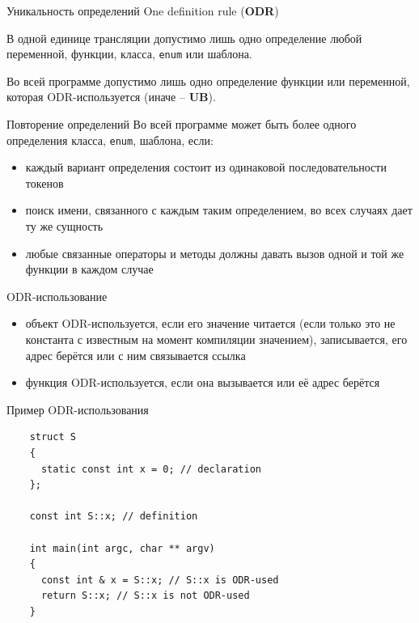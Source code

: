 \documentclass[unknownkeysallowed,xcolor=table]{beamer}
\begin{document}
\begin{frame}{Уникальность определений}
  One definition rule (\textbf{ODR})

  \vspace{2em}

  В одной единице трансляции допустимо лишь одно определение любой переменной, функции, класса, \lstinline{enum} или шаблона.

  \vspace{2em}

  Во всей программе допустимо лишь одно определение функции или переменной, которая ODR-используется (иначе -- \textbf{UB}).
\end{frame}

\begin{frame}{Повторение определений}
  Во всей программе может быть более одного определения класса, \lstinline{enum}, шаблона, если:

  \vspace{1em}

  \begin{itemize}
    \item каждый вариант определения состоит из одинаковой последовательности токенов \vspace{1em}
    \item поиск имени, связанного с каждым таким определением, во всех случаях дает ту же сущность \vspace{1em}
    \item любые связанные операторы и методы должны давать вызов одной и той же функции в каждом случае
  \end{itemize}
\end{frame}

\begin{frame}{ODR-использование}
  \begin{itemize}
    \item объект ODR-используется, если его значение читается (если только это не константа с известным на момент компиляции значением), записывается, его адрес берётся или с ним связывается ссылка \vspace{2em}
    \item функция ODR-используется, если она вызывается или её адрес берётся
  \end{itemize}
\end{frame}

\begin{frame}[fragile]{Пример ODR-использования}
  \begin{lstlisting}
    struct S
    {
      static const int x = 0; // declaration
    };

    const int S::x; // definition

    int main(int argc, char ** argv)
    {
      const int & x = S::x; // S::x is ODR-used
      return S::x; // S::x is not ODR-used
    }
  \end{lstlisting}
\end{frame}
\end{document}
